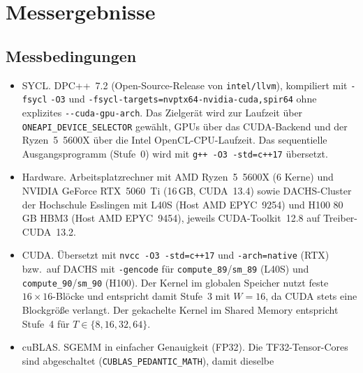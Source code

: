 \documentclass[12pt,a4paper]{article}
\begin{document}
\newpage
{}
\printbibliography[heading=bibintoc, title={Literaturverzeichnis}]

\newpage
\appendix
\section{Messergebnisse}\label{sec:messungen}

\subsection{Messbedingungen}\label{sec:messbedingungen}

\begin{itemize}[nosep]
    \sloppy
    \item SYCL. DPC++~7.2 (Open-Source-Release von
    \texttt{intel/\allowbreak llvm}), kompiliert mit \texttt{-fsycl} \texttt{-O3} und
    \texttt{-fsycl-targets=\allowbreak nvptx64-\allowbreak nvidia-\allowbreak cuda,\allowbreak spir64}
    ohne explizites \texttt{-{}-cuda-\allowbreak gpu-\allowbreak arch}. Das Zielgerät wird zur Laufzeit
    über \texttt{ONEAPI\_\allowbreak DEVICE\_\allowbreak SELECTOR} gewählt, GPUs über das CUDA-Backend und
    der Ryzen~5~5600X über die Intel OpenCL-CPU-Laufzeit. Das sequentielle
    Ausgangsprogramm (Stufe~0) wird mit \texttt{g++ -O3 -std=c++17} übersetzt.
    \item Hardware. Arbeitsplatzrechner mit AMD Ryzen~5~5600X (6 Kerne)
    und NVIDIA GeForce RTX~5060~Ti (16\,GB, CUDA~13.4) sowie DACHS-Cluster der
    Hochschule Esslingen mit L40S (Host AMD EPYC~9254) und
    H100 80\,GB HBM3 (Host AMD EPYC~9454), jeweils CUDA-Toolkit~12.8 auf
    Treiber-CUDA~13.2.
    \item CUDA. Übersetzt mit \texttt{nvcc -O3 -std=c++17} und
    \texttt{-arch=native} (RTX) bzw.\ auf DACHS mit \texttt{-gencode} für
    \texttt{compute\_89}/\texttt{sm\_89} (L40S) und
    \texttt{compute\_90}/\texttt{sm\_90} (H100).
    Der Kernel im globalen Speicher nutzt feste $16 \times 16$-Blöcke
    und entspricht damit Stufe~3 mit $W = 16$, da CUDA stets eine Blockgröße
    verlangt. Der gekachelte Kernel im Shared Memory entspricht Stufe~4 für
    $T \in \{8, 16, 32, 64\}$.
    \item cuBLAS. SGEMM in einfacher Genauigkeit (FP32). Die
    TF32-Tensor-Cores sind abgeschaltet
    (\texttt{CUBLAS\_\allowbreak PEDANTIC\_\allowbreak MATH}), damit dieselbe

\end{itemize}
\end{document}
